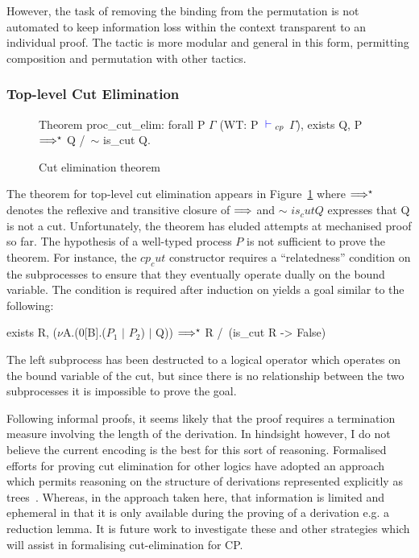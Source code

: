 However, the task of removing the binding from the permutation is not
automated to keep information loss within the context transparent to an
individual proof. The tactic is more modular and general in this form,
permitting composition and permutation with other tactics.

\subsubsection{Top-level Cut Elimination}\label{sec:cutelim}

\begin{figure}
\begin{coq}
Theorem proc_cut_elim:
  forall P $\Gamma$
         (WT: P ${\color{blue} {} \vdash {}}_{cp}$ $\Gamma$),
    exists Q, P $\Longrightarrow^\star$ Q /\ $\sim$ is_cut Q.
\end{coq}
\caption{Cut elimination theorem}
\label{fig:cutelim}
\end{figure}

The theorem for top-level cut elimination appears in Figure~\ref{fig:cutelim}
where $\Longrightarrow^\star$ denotes the reflexive and transitive closure of
$\Longrightarrow$ and $\sim$ \coqe$is_cut Q$ expresses that Q is not a cut.
Unfortunately, the theorem has eluded attempts at mechanised proof so far. The
hypothesis of a well-typed process \coqe$P$ is not sufficient to prove the
theorem. For instance, the \coqe$cp_cut$ constructor requires a
``relatedness'' condition on the subprocesses to ensure that they eventually
operate dually on the bound variable. The condition is required after
induction on  yields a goal similar to the following:
\begin{coq}
exists R, ($\nu$A.(0[B].($P_1$ $\mid$ $P_2$) $\mid$ Q)) $\Longrightarrow^\star$ R
          /\ (is_cut R -> False)
\end{coq}

The left subprocess has been destructed to a logical operator which operates
on the bound variable of the cut, but since there is no relationship between
the two subprocesses it is impossible to prove the goal.

Following informal proofs, it seems likely that the proof requires a
termination measure involving the length of the derivation. In hindsight
however, I do not believe the current encoding is the best for this sort of
reasoning. Formalised efforts for proving cut elimination for other logics
have adopted an approach which permits reasoning on the structure of
derivations represented explicitly as
trees~\cite{Tews:2013,Dawson:2010,Dawson:2002}. Whereas, in the approach taken
here, that information is limited and ephemeral in that it is only available
during the proving of a derivation e.g. a reduction lemma. It is future work
to investigate these and other strategies which will assist in formalising
cut-elimination for CP.


